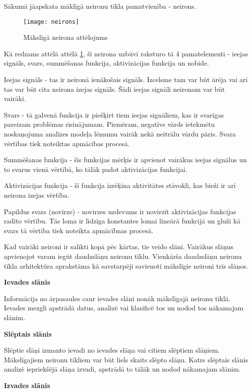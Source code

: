 Sākumā jāapskata māklīgā neironu tīkla pamatvienība - neirons.
\begin{figure}[H]
	\texttt{[image: neirons]}
	\caption{Mākslīgā neirona attēlojums}
	\label{fig:neirons}
\end{figure}

Kā redzams attēlā attēlā \ref{fig:neirons}, šī neirona uzbūvi raksturo tā 4 pamatelementi - ieejas signāls, svars, summēšanas funkcija, aktivizācijas funkcija un nobīde.

Ieejas signāls - tas ir neironā ienākošais signāls. Izcelsme tam var būt ārēja vai arī tas var būt cita neirona izejas signāls. Šādi ieejas signāli neironam var būt vairāki.

Svars - tā galvenā funkcija ir piešķirt tiem ieejas signāliem, kas ir svarīgas pareizam problēmas risinājumam. Piemēram, negatīvs vārds ietekmētu noskaņojuma analīzes modeļa lēmumu vairāk nekā neitrālu vārdu pāris. Svara vērtības tiek noteiktas apmācības procesā.

Summēšanas funkcija - šīs funkcijas mērķis ir apvienot vairākus ieejas signālus un to svarus vienā vērtībā, ko tālāk padot aktivizācijas funkcijai.

Aktivizācijas funkcija - šī funkcija izrēķina aktivitātes stāvokli, kas bieži ir arī neirona izejas vērtība.	

Papildus svars (novirze) -  novirzes uzdevums ir novirzīt aktivizācijas funkcijas radīto vērtību. Tās loma ir līdzīga konstantes lomai lineārā funkcijā un gluži kā svars tā vērtība tiek noteikta apmācībnas procesā.

Kad vairāki neironi ir salikti kopā pēc kārtas, tie veido slāni. Vairākus slāņus apvienojot varam iegūt daudzslāņu neironu tīklu. Vienkārša daudzslāņu neironu tīkla arhitektūra aprakstāma kā savstarpēji savienoti mākslīgie neironi trīs slāņos.

\textbf{Ievades slānis}

Informācija no ārpasaules caur ievades slāni nonāk mākslīgajā neironu tīklā. Ievades mezgli apstrādā datus, analizē vai klasificē tos un nodod tos nākamajam slānim.

\textbf{Slēptais slānis}

Slēptie slāņi izmanto ievadi no ievades slāņa vai citiem slēptiem slāņiem. Mākslīgajiem neironu tīkliem var būt liels skaits slēpto slāņu. Katrs slēptais slānis analizē iepriekšējā slāņa izvadi, apstrādā to tālāk un nodod nākamajam slānim.

\textbf{Izvades slānis}

